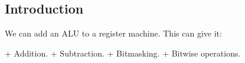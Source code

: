 
\subsection{Introduction}

We can add an ALU to a register machine. This can give it:

+ Addition.
+ Subtraction.
+ Bitmasking.
+ Bitwise operations.
